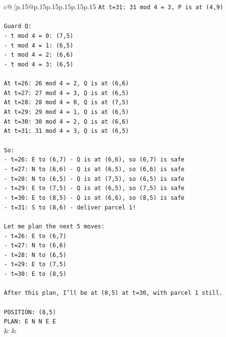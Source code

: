 \documentclass{article}
\begin{document}
{\begin{supertabular}{c@{$\;$}|p{.15\linewidth}@{}p{.15\linewidth}p{.15\linewidth}p{.15\linewidth}p{.15\linewidth}p{.15\linewidth}}
{{{\texttt{At t=31: 31 mod 4 = 3, P is at (4,9)} \\
\\ 
\texttt{Guard Q:} \\
\texttt{{-} t mod 4 = 0: (7,5)} \\
\texttt{{-} t mod 4 = 1: (6,5)} \\
\texttt{{-} t mod 4 = 2: (6,6)} \\
\texttt{{-} t mod 4 = 3: (6,5)} \\
\\ 
\texttt{At t=26: 26 mod 4 = 2, Q is at (6,6)} \\
\texttt{At t=27: 27 mod 4 = 3, Q is at (6,5)} \\
\texttt{At t=28: 28 mod 4 = 0, Q is at (7,5)} \\
\texttt{At t=29: 29 mod 4 = 1, Q is at (6,5)} \\
\texttt{At t=30: 30 mod 4 = 2, Q is at (6,6)} \\
\texttt{At t=31: 31 mod 4 = 3, Q is at (6,5)} \\
\\ 
\texttt{So:} \\
\texttt{{-} t=26: E to (6,7) {-} Q is at (6,6), so (6,7) is safe} \\
\texttt{{-} t=27: N to (6,6) {-} Q is at (6,5), so (6,6) is safe} \\
\texttt{{-} t=28: N to (6,5) {-} Q is at (7,5), so (6,5) is safe} \\
\texttt{{-} t=29: E to (7,5) {-} Q is at (6,5), so (7,5) is safe} \\
\texttt{{-} t=30: E to (8,5) {-} Q is at (6,6), so (8,5) is safe} \\
\texttt{{-} t=31: S to (8,6) {-} deliver parcel 1!} \\
\\ 
\texttt{Let me plan the next 5 moves:} \\
\texttt{{-} t=26: E to (6,7)} \\
\texttt{{-} t=27: N to (6,6)} \\
\texttt{{-} t=28: N to (6,5)} \\
\texttt{{-} t=29: E to (7,5)} \\
\texttt{{-} t=30: E to (8,5)} \\
\\ 
\texttt{After this plan, I'll be at (8,5) at t=30, with parcel 1 still.} \\
\\ 
\texttt{POSITION: (8,5)} \\
\texttt{PLAN: E N N E E} \\
            }
        }
    }
    & & \\ \\


\end{supertabular}}
\end{document}

